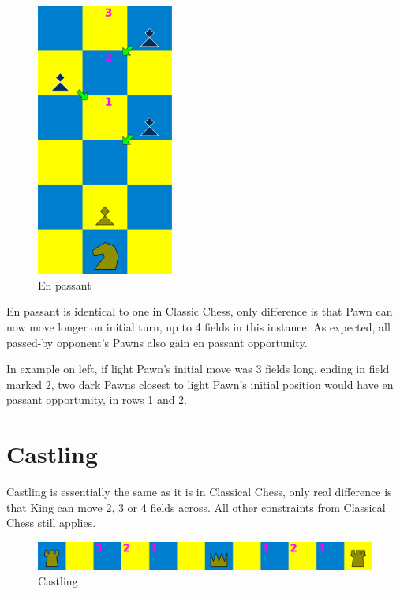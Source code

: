 \documentclass[a5paper,12pt,draft]{book} %
\begin{document}
\noindent
\begin{figure}
\includegraphics[width=0.4\textwidth, keepaspectratio=true]{../gfx/en_passants/06_mayan_ascendancy_en_passant.png}
\caption{En passant}
\label{fig:ma_en_passant}
\end{figure}
En passant is identical to one in Classic Chess, only difference is that Pawn can now
move longer on initial turn, up to 4 fields in this instance. As expected, all passed-by
opponent's Pawns also gain en passant opportunity.

In example on left, if light Pawn's initial move was 3 fields long, ending in field marked
2, two dark Pawns closest to light Pawn's initial position would have en passant opportunity,
in rows 1 and 2.

\clearpage

\section*{Castling}

Castling is essentially the same as it is in Classical Chess, only real difference is that
King can move 2, 3 or 4 fields across. All other constraints from Classical Chess still
applies.

\noindent
\begin{figure}[!h]
\includegraphics[width=1.0\textwidth, keepaspectratio=true]{../gfx/castlings/06_mayan_ascendancy_castling.png}
\caption{Castling}
\label{fig:ma_castling}
\end{figure}
\end{document}
